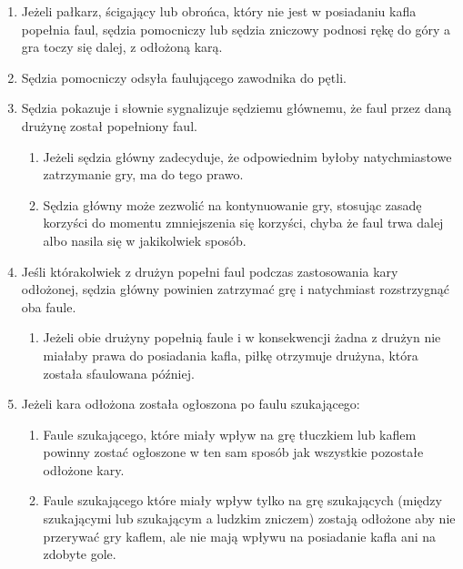 \documentclass[12pt]{article}
\begin{document}
\begin{enumerate}
\item
    Jeżeli pałkarz, ścigający lub obrońca, który nie jest w posiadaniu
  kafla popełnia faul, sędzia pomocniczy lub sędzia zniczowy podnosi
  rękę do góry a gra toczy się dalej, z odłożoną karą.
  \item
    Sędzia pomocniczy odsyła faulującego zawodnika do pętli.
  \item
    Sędzia pokazuje i słownie sygnalizuje sędziemu głównemu, że faul przez
  daną drużynę został popełniony faul.
  
  \begin{enumerate}
  \item
        Jeżeli sędzia główny zadecyduje, że odpowiednim byłoby
    natychmiastowe zatrzymanie gry, ma do tego prawo.
      \item
        Sędzia główny może zezwolić na kontynuowanie gry, stosując zasadę
    korzyści do momentu zmniejszenia się korzyści, chyba że faul trwa
    dalej albo nasila się w jakikolwiek sposób.
      \end{enumerate}
\item
    Jeśli którakolwiek z drużyn popełni faul podczas zastosowania kary
  odłożonej, sędzia główny powinien zatrzymać grę i natychmiast
  rozstrzygnąć oba faule.
  
  \begin{enumerate}
  \item
        Jeżeli obie drużyny popełnią faule i w konsekwencji żadna z drużyn
    nie miałaby prawa do posiadania kafla, piłkę otrzymuje drużyna,
    która została sfaulowana później.
      \end{enumerate}
\item
    Jeżeli kara odłożona została ogłoszona po faulu szukającego:
  
  \begin{enumerate}
  \item
        Faule szukającego, które miały wpływ na grę tłuczkiem lub kaflem
    powinny zostać ogłoszone w ten sam sposób jak wszystkie pozostałe
    odłożone kary.
      \item
        Faule szukającego które miały wpływ tylko na grę szukających (między
    szukającymi lub szukającym a ludzkim zniczem) zostają odłożone aby
    nie przerywać gry kaflem, ale nie mają wpływu na posiadanie kafla
    ani na zdobyte gole.
      \end{enumerate}
\end{enumerate}
\end{document}
